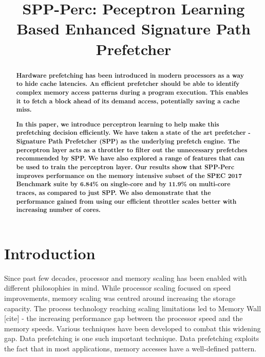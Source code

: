 \documentclass{sig-alternate}
\title{SPP-Perc: Peceptron Learning Based Enhanced Signature Path Prefetcher}
\author{}
\begin{document}
\maketitle
\thispagestyle{firstpage}
\pagestyle{plain}

\begin{abstract}
\textbf{Hardware prefetching has been introduced in modern processors as a way to hide cache latencies. 
An efficient prefetcher should be able to identify complex memory access patterns during a program execution. 
This enables it to fetch a block ahead of its demand access, potentially saving a cache miss.
}

\textbf{In this paper, we introduce perceptron learning to help make this prefetching decision efficiently. 
We have taken a state of the art prefetcher - Signature Path Prefetcher (SPP) as the underlying prefetch engine. 
The perceptron layer acts as a throttler to filter out the unnecessary prefetches recommended by SPP. 
We have also explored a range of features that can be used to train the perceptron layer. 
Our results show that SPP-Perc improves performance on the memory intensive subset of the SPEC 2017 Benchmark suite by 6.84\% on single-core and by 11.9\% on multi-core traces, as compared to just SPP.
We also demonstrate that the performance gained from using our efficient throttler scales better with increasing number of cores.
}
\end{abstract}

\section{Introduction}
Since past few decades, processor and memory scaling has been enabled with different philosophies in mind. 
While processor scaling focused on speed improvements, memory scaling was centred around increasing the storage capacity. 
The process technology reaching scaling limitations led to Memory Wall [cite] - the increasing performance gap between the processor speed and the memory speeds. 
Various techniques have been developed to combat this widening gap. 
Data prefetching is one such important technique. 
Data prefetching exploits the fact that in most applications, memory accesses have a well-defined pattern.
\end{document}
